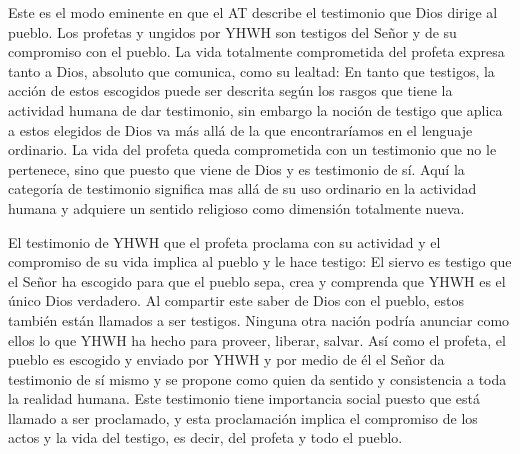 Este es el modo eminente en que el AT describe el testimonio que Dios dirige al
pueblo. Los profetas y ungidos por YHWH son testigos del Señor y de su
compromiso con el pueblo. La vida totalmente comprometida del profeta expresa
tanto a Dios, absoluto que comunica, como su lealtad:
En tanto que testigos, la acción de estos escogidos puede ser descrita según los
rasgos que tiene la actividad humana de dar testimonio, sin embargo la noción de
testigo que aplica a estos elegidos de Dios va más allá de la que encontraríamos
en el lenguaje ordinario. La vida del profeta queda comprometida con un
testimonio que no le pertenece, sino que \autocite[118]{prades2015testimonio} puesto que viene de Dios y es
testimonio de sí. Aquí la categoría de testimonio significa mas allá de su uso
ordinario en la actividad humana y adquiere un sentido religioso como dimensión
totalmente nueva\autocite[Cf.][118]{prades2015testimonio}.

El testimonio de YHWH que el profeta proclama con su actividad y el compromiso
de su vida implica al pueblo y le hace testigo:
El siervo es testigo que el Señor ha escogido para que el pueblo sepa, crea y
comprenda que YHWH es el único Dios verdadero. Al compartir este saber de Dios
con el pueblo, estos también están llamados a ser testigos. Ninguna otra nación
podría anunciar como ellos lo que YHWH ha hecho para proveer, liberar, salvar.
Así como el profeta, el pueblo es escogido y enviado por YHWH y por medio de él
el Señor da testimonio de sí mismo y se propone como quien da sentido y
consistencia a toda la realidad humana. Este testimonio tiene importancia social
puesto que está llamado a ser proclamado, y esta proclamación implica el
compromiso de los actos y la vida del testigo, es decir, del profeta y todo el
pueblo.\autocite[Cf.][1526s]{latourelle2000testimonio}

